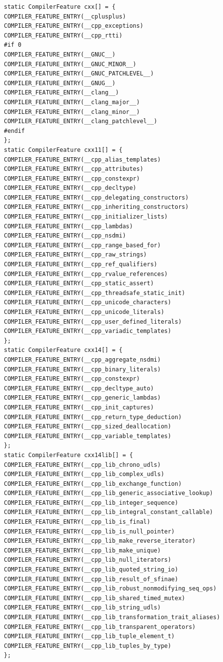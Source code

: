 \begin{lstlisting}[style=styleCXX]
static CompilerFeature cxx[] = {
COMPILER_FEATURE_ENTRY(__cplusplus)
COMPILER_FEATURE_ENTRY(__cpp_exceptions)
COMPILER_FEATURE_ENTRY(__cpp_rtti)
#if 0
COMPILER_FEATURE_ENTRY(__GNUC__)
COMPILER_FEATURE_ENTRY(__GNUC_MINOR__)
COMPILER_FEATURE_ENTRY(__GNUC_PATCHLEVEL__)
COMPILER_FEATURE_ENTRY(__GNUG__)
COMPILER_FEATURE_ENTRY(__clang__)
COMPILER_FEATURE_ENTRY(__clang_major__)
COMPILER_FEATURE_ENTRY(__clang_minor__)
COMPILER_FEATURE_ENTRY(__clang_patchlevel__)
#endif
};
static CompilerFeature cxx11[] = {
COMPILER_FEATURE_ENTRY(__cpp_alias_templates)
COMPILER_FEATURE_ENTRY(__cpp_attributes)
COMPILER_FEATURE_ENTRY(__cpp_constexpr)
COMPILER_FEATURE_ENTRY(__cpp_decltype)
COMPILER_FEATURE_ENTRY(__cpp_delegating_constructors)
COMPILER_FEATURE_ENTRY(__cpp_inheriting_constructors)
COMPILER_FEATURE_ENTRY(__cpp_initializer_lists)
COMPILER_FEATURE_ENTRY(__cpp_lambdas)
COMPILER_FEATURE_ENTRY(__cpp_nsdmi)
COMPILER_FEATURE_ENTRY(__cpp_range_based_for)
COMPILER_FEATURE_ENTRY(__cpp_raw_strings)
COMPILER_FEATURE_ENTRY(__cpp_ref_qualifiers)
COMPILER_FEATURE_ENTRY(__cpp_rvalue_references)
COMPILER_FEATURE_ENTRY(__cpp_static_assert)
COMPILER_FEATURE_ENTRY(__cpp_threadsafe_static_init)
COMPILER_FEATURE_ENTRY(__cpp_unicode_characters)
COMPILER_FEATURE_ENTRY(__cpp_unicode_literals)
COMPILER_FEATURE_ENTRY(__cpp_user_defined_literals)
COMPILER_FEATURE_ENTRY(__cpp_variadic_templates)
};
static CompilerFeature cxx14[] = {
COMPILER_FEATURE_ENTRY(__cpp_aggregate_nsdmi)
COMPILER_FEATURE_ENTRY(__cpp_binary_literals)
COMPILER_FEATURE_ENTRY(__cpp_constexpr)
COMPILER_FEATURE_ENTRY(__cpp_decltype_auto)
COMPILER_FEATURE_ENTRY(__cpp_generic_lambdas)
COMPILER_FEATURE_ENTRY(__cpp_init_captures)
COMPILER_FEATURE_ENTRY(__cpp_return_type_deduction)
COMPILER_FEATURE_ENTRY(__cpp_sized_deallocation)
COMPILER_FEATURE_ENTRY(__cpp_variable_templates)
};
static CompilerFeature cxx14lib[] = {
COMPILER_FEATURE_ENTRY(__cpp_lib_chrono_udls)
COMPILER_FEATURE_ENTRY(__cpp_lib_complex_udls)
COMPILER_FEATURE_ENTRY(__cpp_lib_exchange_function)
COMPILER_FEATURE_ENTRY(__cpp_lib_generic_associative_lookup)
COMPILER_FEATURE_ENTRY(__cpp_lib_integer_sequence)
COMPILER_FEATURE_ENTRY(__cpp_lib_integral_constant_callable)
COMPILER_FEATURE_ENTRY(__cpp_lib_is_final)
COMPILER_FEATURE_ENTRY(__cpp_lib_is_null_pointer)
COMPILER_FEATURE_ENTRY(__cpp_lib_make_reverse_iterator)
COMPILER_FEATURE_ENTRY(__cpp_lib_make_unique)
COMPILER_FEATURE_ENTRY(__cpp_lib_null_iterators)
COMPILER_FEATURE_ENTRY(__cpp_lib_quoted_string_io)
COMPILER_FEATURE_ENTRY(__cpp_lib_result_of_sfinae)
COMPILER_FEATURE_ENTRY(__cpp_lib_robust_nonmodifying_seq_ops)
COMPILER_FEATURE_ENTRY(__cpp_lib_shared_timed_mutex)
COMPILER_FEATURE_ENTRY(__cpp_lib_string_udls)
COMPILER_FEATURE_ENTRY(__cpp_lib_transformation_trait_aliases)
COMPILER_FEATURE_ENTRY(__cpp_lib_transparent_operators)
COMPILER_FEATURE_ENTRY(__cpp_lib_tuple_element_t)
COMPILER_FEATURE_ENTRY(__cpp_lib_tuples_by_type)
};


\end{lstlisting}
